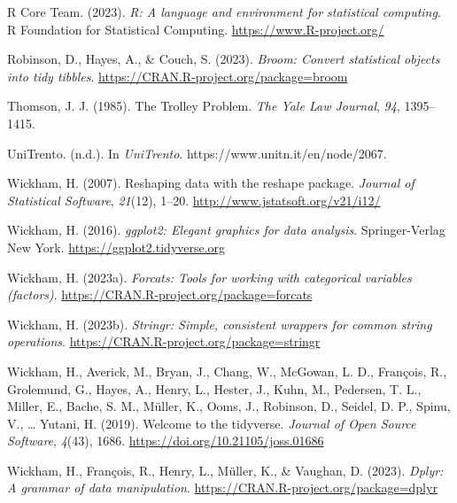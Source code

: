 \documentclass[
  man,floatsintext]{apa7}
\newlength{\cslhangindent}
\newlength{\cslentryspacingunit} %
\newenvironment{CSLReferences}[2] %
 {%
  \setlength{\parindent}{0pt}
  \ifodd #1
  \let\oldpar\par
  \def\par{\hangindent=\cslhangindent\oldpar}
  \fi
  \setlength{\parskip}{#2\cslentryspacingunit}
 }%
 {}
\begin{document}
\begin{CSLReferences}{1}{0}
\leavevmode{}%
R Core Team. (2023). \emph{R: A language and environment for statistical computing}. R Foundation for Statistical Computing. \url{https://www.R-project.org/}

\leavevmode{}%
Robinson, D., Hayes, A., \& Couch, S. (2023). \emph{Broom: Convert statistical objects into tidy tibbles}. \url{https://CRAN.R-project.org/package=broom}

\leavevmode{}%
Thomson, J. J. (1985). The {Trolley Problem}. \emph{The Yale Law Journal}, \emph{94}, 1395--1415.

\leavevmode{}%
{UniTrento}. (n.d.). In \emph{UniTrento}. https://www.unitn.it/en/node/2067.

\leavevmode{}%
Wickham, H. (2007). Reshaping data with the {reshape} package. \emph{Journal of Statistical Software}, \emph{21}(12), 1--20. \url{http://www.jstatsoft.org/v21/i12/}

\leavevmode{}%
Wickham, H. (2016). \emph{ggplot2: Elegant graphics for data analysis}. Springer-Verlag New York. \url{https://ggplot2.tidyverse.org}

\leavevmode{}%
Wickham, H. (2023a). \emph{Forcats: Tools for working with categorical variables (factors)}. \url{https://CRAN.R-project.org/package=forcats}

\leavevmode{}%
Wickham, H. (2023b). \emph{Stringr: Simple, consistent wrappers for common string operations}. \url{https://CRAN.R-project.org/package=stringr}

\leavevmode{}%
Wickham, H., Averick, M., Bryan, J., Chang, W., McGowan, L. D., François, R., Grolemund, G., Hayes, A., Henry, L., Hester, J., Kuhn, M., Pedersen, T. L., Miller, E., Bache, S. M., Müller, K., Ooms, J., Robinson, D., Seidel, D. P., Spinu, V., \ldots{} Yutani, H. (2019). Welcome to the {tidyverse}. \emph{Journal of Open Source Software}, \emph{4}(43), 1686. \url{https://doi.org/10.21105/joss.01686}

\leavevmode{}%
Wickham, H., François, R., Henry, L., Müller, K., \& Vaughan, D. (2023). \emph{Dplyr: A grammar of data manipulation}. \url{https://CRAN.R-project.org/package=dplyr}


\end{CSLReferences}
\end{document}
